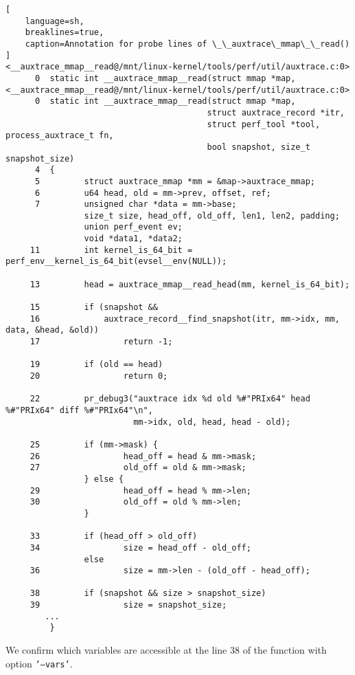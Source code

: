 \documentclass[11pt]{diazessay} %
\def\code#1{\texttt{#1}}
\begin{document}
\begin{lstlisting}[
  	language=sh,
	breaklines=true,
	caption=Annotation for probe lines of \_\_auxtrace\_mmap\_\_read()
]
<__auxtrace_mmap__read@/mnt/linux-kernel/tools/perf/util/auxtrace.c:0>
      0  static int __auxtrace_mmap__read(struct mmap *map,
<__auxtrace_mmap__read@/mnt/linux-kernel/tools/perf/util/auxtrace.c:0>
      0  static int __auxtrace_mmap__read(struct mmap *map,
                                         struct auxtrace_record *itr,
                                         struct perf_tool *tool, process_auxtrace_t fn,
                                         bool snapshot, size_t snapshot_size)
      4  {
      5         struct auxtrace_mmap *mm = &map->auxtrace_mmap;
      6         u64 head, old = mm->prev, offset, ref;
      7         unsigned char *data = mm->base;
                size_t size, head_off, old_off, len1, len2, padding;
                union perf_event ev;
                void *data1, *data2;
     11         int kernel_is_64_bit = perf_env__kernel_is_64_bit(evsel__env(NULL));

     13         head = auxtrace_mmap__read_head(mm, kernel_is_64_bit);

     15         if (snapshot &&
     16             auxtrace_record__find_snapshot(itr, mm->idx, mm, data, &head, &old))
     17                 return -1;

     19         if (old == head)
     20                 return 0;

     22         pr_debug3("auxtrace idx %d old %#"PRIx64" head %#"PRIx64" diff %#"PRIx64"\n",
                          mm->idx, old, head, head - old);

     25         if (mm->mask) {
     26                 head_off = head & mm->mask;
     27                 old_off = old & mm->mask;
                } else {
     29                 head_off = head % mm->len;
     30                 old_off = old % mm->len;
                }

     33         if (head_off > old_off)
     34                 size = head_off - old_off;
                else
     36                 size = mm->len - (old_off - head_off);

     38         if (snapshot && size > snapshot_size)
     39                 size = snapshot_size;
		...
         }
\end{lstlisting}

We confirm which variables are accessible at the line 38 of the function with
option \code{'---vars'}.
\end{document}
